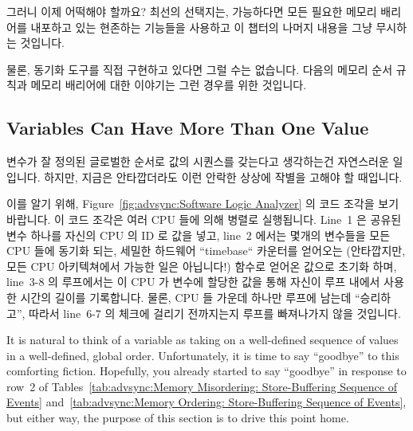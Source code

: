 그러니 이제 어떡해야 할까요?
최선의 선택지는, 가능하다면 모든 필요한 메모리 배리어를 내포하고 있는 현존하는
기능들을 사용하고 이 챕터의 나머지 내용을 그냥 무시하는 것입니다.

물론, 동기화 도구를 직접 구현하고 있다면 그럴 수는 없습니다.
다음의 메모리 순서 규칙과 메모리 배리어에 대한 이야기는 그런 경우를 위한
것입니다.

\subsection{Variables Can Have More Than One Value}
\label{sec:advsync:Variables Can Have More Than One Value}

변수가 잘 정의된 글로벌한 순서로 값의 시퀀스를 갖는다고 생각하는건 자연스러운
일입니다.
하지만, 지금은 안타깝더라도 이런 안락한 상상에 작별을 고해야 할 때입니다.

이를 알기 위해, Figure~\ref{fig:advsync:Software Logic Analyzer} 의 코드 조각을
보기 바랍니다.
이 코드 조각은 여러 CPU 들에 의해 병렬로 실행됩니다.
Line~1 은 공유된 변수 하나를 자신의 CPU 의 ID 로 값을 넣고, line~2 에서는
몇개의 변수들을 모든 CPU 들에 동기화 되는, 세밀한 하드웨어 ``timebase``
카운터를 얻어오는 (안타깝지만, 모든 CPU 아키텍쳐에서 가능한 일은 아닙니다!)
 함수로 얻어온 값으로 초기화 하며, line~3-8 의 루프에서는 이 CPU 가
변수에 할당한 값을 통해 자신이 루프 내에서 사용한 시간의 길이를 기록합니다.
물론, CPU 들 가운데 하나만 루프에 남는데 ``승리하고'', 따라서 line~6-7 의
체크에 걸리기 전까지는지 루프를 빠져나가지 않을 것입니다.
\iffalse

It is natural to think of a variable as taking on a well-defined
sequence of values in a well-defined, global order.
Unfortunately, it is time to say ``goodbye'' to this comforting fiction.
Hopefully, you already started to say ``goodbye'' in response to row~2 of
Tables~\ref{tab:advsync:Memory Misordering: Store-Buffering Sequence of Events}
and~\ref{tab:advsync:Memory Ordering: Store-Buffering Sequence of Events},
but either way, the purpose of this section is to drive this point home.

